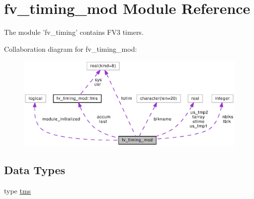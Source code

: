 \section{fv\-\_\-timing\-\_\-mod Module Reference}
\label{classfv__timing__mod}


The module 'fv\-\_\-timing' contains F\-V3 timers.  




Collaboration diagram for fv\-\_\-timing\-\_\-mod\-:
\nopagebreak
\begin{figure}[H]
\begin{center}
\leavevmode
\includegraphics[width=350pt]{classfv__timing__mod__coll__graph}
\end{center}
\end{figure}
\subsection*{Data Types}
\begin{DoxyCompactItemize}
\item 
type \hyperlink{structfv__timing__mod_1_1tms}{tms}
\end{DoxyCompactItemize}
